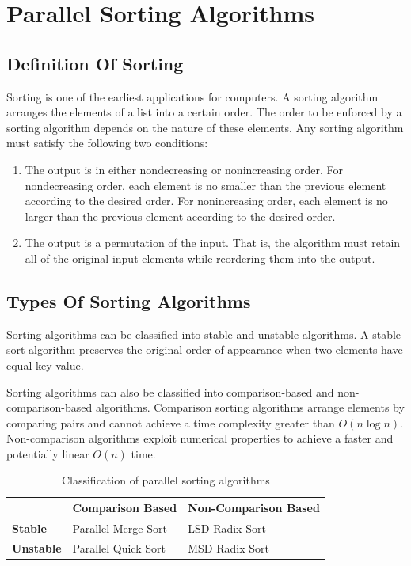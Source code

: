 \documentclass[12pt,a4paper]{article}
\begin{document}
\section{Parallel Sorting Algorithms}

\subsection{Definition Of Sorting}

Sorting is one of the earliest applications for computers. A sorting algorithm arranges the elements
of a list into a certain order. The order to be enforced by a sorting algorithm depends on the nature
of these elements. Any sorting algorithm must satisfy the following two conditions:

\begin{enumerate}
    \item The output is in either nondecreasing or nonincreasing order. For nondecreasing order,
          each element is no smaller than the previous element according to the desired order. For
          nonincreasing order, each element is no larger than the previous element according to the
          desired order.
    \item The output is a permutation of the input. That is, the algorithm must retain all of the
          original input elements while reordering them into the output. \cite{hwu_hajj}
\end{enumerate}

\subsection{Types Of Sorting Algorithms}

Sorting algorithms can be classified into stable and unstable algorithms. A stable sort algorithm
preserves the original order of appearance when two elements have equal key value.

Sorting algorithms can also be classified into comparison-based and non-comparison-based
algorithms. Comparison sorting algorithms arrange elements by comparing pairs and cannot achieve
a time complexity greater than $O(n \log n)$. Non-comparison algorithms exploit numerical
properties to achieve a faster and potentially linear $O(n)$ time.

\begin{table}[h]
    \centering
    \caption{Classification of parallel sorting algorithms}
    \begin{tabular}{lll}
        \toprule
        & \textbf{Comparison Based} & \textbf{Non-Comparison Based} \\
        \midrule
        \textbf{Stable}   & Parallel Merge Sort  & LSD Radix Sort \\
        \textbf{Unstable} & Parallel Quick Sort  & MSD Radix Sort \\
        \bottomrule
    \end{tabular}
\end{table}
\end{document}
